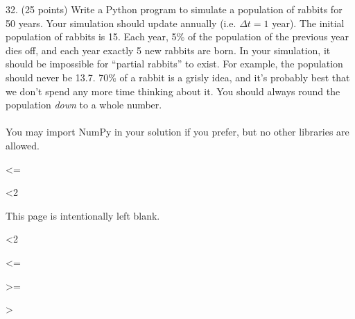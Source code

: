 \documentclass{article}
\begin{document}
\noindent
\begin{minipage}{\textwidth}
32. (25 points)
Write a Python program to simulate a population of rabbits for 50 years. Your simulation should update annually (i.e. $\Delta t=1$ year). The initial population of rabbits is 15. Each year, 5\% of the population of the previous year dies off, and each year exactly 5 new rabbits are born. In your simulation, it should be impossible for ``partial rabbits'' to exist. For example, the population should never be 13.7. 70\% of a rabbit is a grisly idea, and it's probably best that we don't spend any more time thinking about it. You should always round the population \emph{down} to a whole number.
\\\\
\noindent You may import NumPy in your solution if you prefer, but no other libraries are allowed.

\end{minipage}
\vspace{10em}
\filbreak\vfil{}\vfilneg


\ifnum\maxrawpages<\thepage \maxrawpages=\thepage\fi

\ifnum\thepage<2
\loop
\newpage \ \par \vspace*{\fill}\centerline{This page is intentionally left blank.}\vspace*{\fill}
\ifnum \thepage<2
\repeat
\fi

\ifnum\maxpadpages<\thepage \maxpadpages=\thepage\fi

\ifnum\minpadpages>\thepage \minpadpages=\thepage\fi


\cleardoublepage
{}
\ifnum\maxpadpages>\minpadpages {}
\else{}\fi
\end{document}
